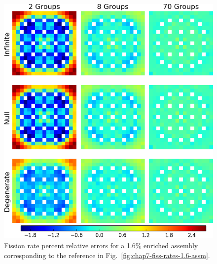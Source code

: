 \begin{figure}[h!]
\centering
\includegraphics[width=\linewidth]{figures/quantification/assm-16/fiss-err}
\caption[Fission rate errors for a 1.6\% enriched assembly]{Fission rate percent relative errors for a 1.6\% enriched assembly corresponding to the reference in Fig.~\ref{fig:chap7-fiss-rates-1.6-assm}.}
\label{fig:chap8-assm-1.6-fiss-err}
\end{figure}

\clearpage

